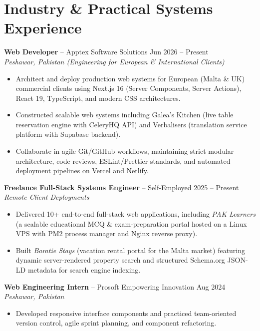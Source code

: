 \documentclass[10pt,a4paper]{article}
\begin{document}
\newpage

\section{Industry \& Practical Systems Experience}

\textbf{Web Developer} -- Apptex Software Solutions \hfill Jun 2026 -- Present \\
\textit{Peshawar, Pakistan (Engineering for European \& International Clients)}
\begin{itemize}
    \item Architect and deploy production web systems for European (Malta \& UK) commercial clients using Next.js 16 (Server Components, Server Actions), React 19, TypeScript, and modern CSS architectures.
    \item Constructed scalable web systems including Galea's Kitchen (live table reservation engine with CeleryHQ API) and Verbalisers (translation service platform with Supabase backend).
    \item Collaborate in agile Git/GitHub workflows, maintaining strict modular architecture, code reviews, ESLint/Prettier standards, and automated deployment pipelines on Vercel and Netlify.
\end{itemize}

\vspace{4pt}
\textbf{Freelance Full-Stack Systems Engineer} -- Self-Employed \hfill 2025 -- Present \\
\textit{Remote Client Deployments}
\begin{itemize}
    \item Delivered 10+ end-to-end full-stack web applications, including \textit{PAK Learners} (a scalable educational MCQ \& exam-preparation portal hosted on a Linux VPS with PM2 process manager and Nginx reverse proxy).
    \item Built \textit{Baratie Stays} (vacation rental portal for the Malta market) featuring dynamic server-rendered property search and structured Schema.org JSON-LD metadata for search engine indexing.
\end{itemize}

\vspace{4pt}
\textbf{Web Engineering Intern} -- Prosoft Empowering Innovation \hfill Aug 2024 \\
\textit{Peshawar, Pakistan}
\begin{itemize}
    \item Developed responsive interface components and practiced team-oriented version control, agile sprint planning, and component refactoring.
\end{itemize}
\end{document}
